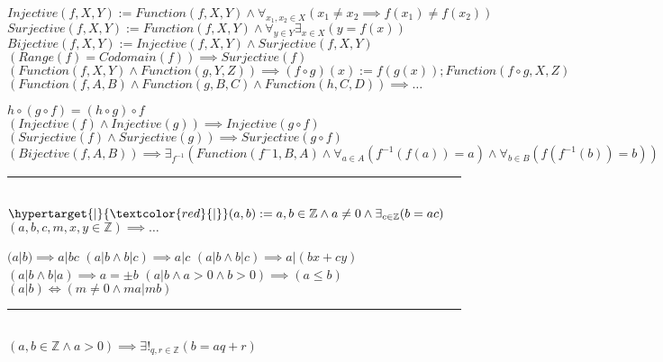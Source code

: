 \documentclass{book}
\newcommand{\df}[1]{\hypertarget{#1}{\textcolor{red}{#1}}}
\newcommand{\wff}[1]{\hypertarget{#1}{\fbox{\textcolor{red}{$#1$}}\phantom{--}}}
\newcommand{\abr}{:=}
\begin{document}
$Injective(f, X, Y) \abr Function(f, X, Y) \land \forall_{x_1, x_2 \in X}(x_1 \neq x_2 \implies f(x_1) \neq f(x_2))$ \\ %
$Surjective(f, X, Y) \abr Function(f, X, Y) \land \forall_{y \in Y} \exists_{x \in X}(y = f(x))$ \\ %
$Bijective(f, X, Y) \abr Injective(f, X, Y) \land Surjective(f, X, Y)$ \\ %
\wff{Surjective Equivalent} $(Range(f) = Codomain(f)) \implies Surjective(f)$ \\

$(Function(f, X, Y) \land Function(g, Y, Z)) \implies (f \circ g)(x) \abr f(g(x)); Function(f \circ g, X, Z)$ \\

\wff{Properties of Functions} $(Function(f, A, B) \land Function(g, B, C) \land Function(h, C, D)) \implies \ldots$
\begin{enumerate}
  \lit $h \circ (g \circ f) = (h \circ g) \circ f$
  \lit $(Injective(f) \land Injective(g)) \implies Injective(g \circ f)$
  \lit $(Surjective(f) \land Surjective(g)) \implies Surjective(g \circ f)$
  \lit $(Bijective(f, A, B)) \implies \exists_{f^{-1}}(Function(f^-1, B, A) \land \forall_{a \in A}(f^{-1}(f(a)) = a) \land \forall_{b \in B}(f(f^{-1}(b)) = b))$
\end{enumerate} \vspace{.75mm} \hrule \vspace{.75mm} \ \\ 

$\df{|}(a, b) \abr a, b \in \mathbb{Z} \land a \neq 0 \land \exists_{c \in \mathbb{Z}}(b = a c)$ \\

\wff{Divisibility Theorems} $(a, b, c, m, x, y \in \mathbb{Z}) \implies \ldots$
\begin{enumerate}
  \lit $(a | b) \implies a | b c$
  \lit $(a | b \land b | c) \implies a | c$
  \lit $(a | b \land b | c) \implies a | (b x + c y)$
  \lit $(a | b \land b | a) \implies a = \pm b$
  \lit $(a | b \land a > 0 \land b > 0) \implies (a \leq b)$
  \lit $(a | b) \iff (m \neq 0 \land m a | m b)$
\end{enumerate} \vspace{.75mm} \hrule \vspace{.75mm} \ \\ 

\wff{Division Algorithm} $(a, b \in \mathbb{Z} \land a > 0) \implies \exists!_{q, r \in \mathbb{Z}}(b = a q + r)$ \\
\end{document}
